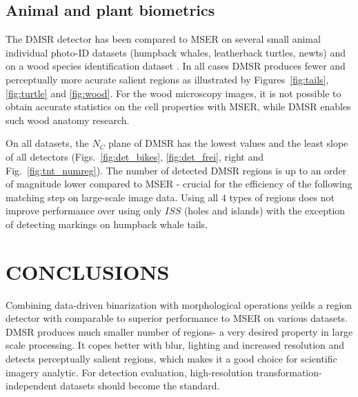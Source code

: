 \documentclass{article}
\begin{document}
\subsection{Animal and plant biometrics}
\label{ssec:bio}
The DMSR detector has been compared to MSER on several small animal individual photo-ID datasets (humpback whales, leatherback turtles, newts) and on a wood species identification dataset \cite{RangHumpb06, PauwelsZB08, wood}. In all cases DMSR produces fewer and perceptually more acurate salient regions as illustrated by Figures~\ref{fig:tails}, \ref{fig:turtle} and \ref{fig:wood}. For the wood microscopy images, it is not possible to obtain accurate statistics on the cell properties with MSER, while DMSR enables such wood anatomy research.

On all datasets, the $N_C$ plane of DMSR has the lowest values and the least slope of all detectors (Figs.~\ref{fig:det_bikes}, \ref{fig:det_frei}, right and Fig.~\ref{fig:tnt_numreg}). 
The number of detected DMSR regions is up to an order of magnitude lower compared to MSER - crucial for the efficiency of the following matching step on large-scale image data.
Using all $4$ types of regions does not improve performance over using only $ISS$ (holes and islands) with the exception of detecting markings on humpback whale tails. 

\section{CONCLUSIONS}
Combining data-driven binarization with morphological operations yeilds a region detector with comparable to superior performance to MSER on various datasets. DMSR produces much smaller number of regions- a very desired property in large scale processing. It copes better with blur, lighting and increased resolution and detects perceptually salient regions, which makes it a good choice for scientific imagery analytic. 
For detection evaluation, high-resolution transformation-independent datasets should become the standard.
\label{sec:concl}










\end{document}
